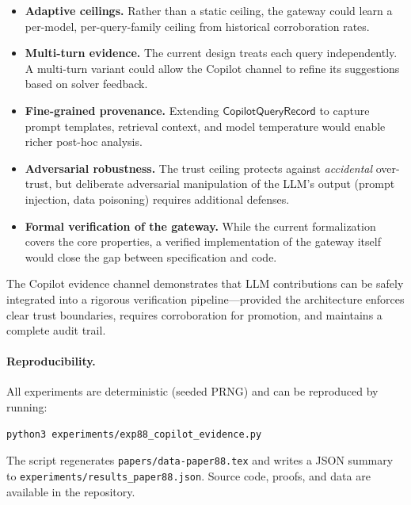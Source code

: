 \documentclass[11pt]{article}
\newcommand{\QRec}{\mathsf{CopilotQueryRecord}}
\begin{document}
\begin{itemize}[leftmargin=2em]
\item \textbf{Adaptive ceilings.}
  Rather than a static ceiling, the gateway could learn a
  per-model, per-query-family ceiling from historical
  corroboration rates.

\item \textbf{Multi-turn evidence.}
  The current design treats each query independently.  A
  multi-turn variant could allow the Copilot channel to
  refine its suggestions based on solver feedback.

\item \textbf{Fine-grained provenance.}
  Extending $\QRec$ to capture prompt templates, retrieval
  context, and model temperature would enable richer
  post-hoc analysis.

\item \textbf{Adversarial robustness.}
  The trust ceiling protects against \emph{accidental}
  over-trust, but deliberate adversarial manipulation of
  the LLM's output (prompt injection, data poisoning)
  requires additional defenses.

\item \textbf{Formal verification of the gateway.}
  While the current \LEAN{} formalization covers the core
  properties, a verified implementation of the gateway
  itself would close the gap between specification and code.
\end{itemize}

The Copilot evidence channel demonstrates that LLM
contributions can be safely integrated into a rigorous
verification pipeline---provided the architecture enforces
clear trust boundaries, requires corroboration for promotion,
and maintains a complete audit trail.

\paragraph{Reproducibility.}
All experiments are deterministic (seeded PRNG) and can be
reproduced by running:
\begin{lstlisting}[style=jugeo-output]
python3 experiments/exp88_copilot_evidence.py
\end{lstlisting}
The script regenerates \texttt{papers/data-paper88.tex} and
writes a JSON summary to
\texttt{experiments/results\_paper88.json}.
Source code, proofs, and data are available in the \JuGeo{}
repository.
\end{document}
